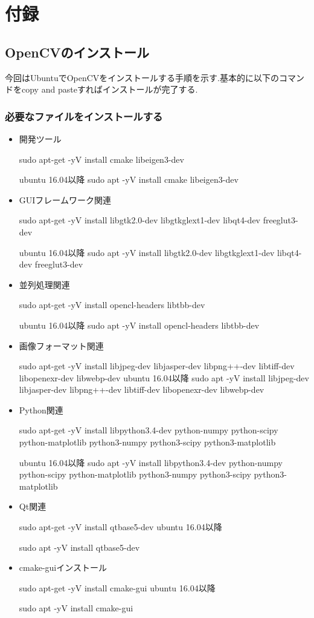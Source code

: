 \documentclass[12pt,oneside]{sotsuken_paper}
\begin{document}
\chapter*{付録}
\def\thesection{\Alph{section}}
\appendix%
\section{OpenCVのインストール}
今回はUbuntuでOpenCVをインストールする手順を示す.基本的に以下のコマンドをcopy and pasteすればインストールが完了する.
\subsection{必要なファイルをインストールする}
\begin{itemize}
\item 開発ツール

sudo apt-get -yV install cmake libeigen3-dev

ubuntu 16.04以降
sudo apt -yV install cmake libeigen3-dev

\item GUIフレームワーク関連

sudo apt-get -yV install libgtk2.0-dev libgtkglext1-dev libqt4-dev freeglut3-dev


ubuntu 16.04以降
sudo apt -yV install libgtk2.0-dev libgtkglext1-dev libqt4-dev freeglut3-dev

\item 並列処理関連

sudo apt-get -yV install opencl-headers libtbb-dev

ubuntu 16.04以降
sudo apt -yV install opencl-headers libtbb-dev

\item 画像フォーマット関連

sudo apt-get -yV install libjpeg-dev libjasper-dev libpng++-dev libtiff-dev libopenexr-dev libwebp-dev
ubuntu 16.04以降
sudo apt -yV install libjpeg-dev libjasper-dev libpng++-dev libtiff-dev libopenexr-dev libwebp-dev


\item Python関連

sudo apt-get -yV install libpython3.4-dev python-numpy python-scipy python-matplotlib python3-numpy python3-scipy python3-matplotlib

ubuntu 16.04以降
sudo apt -yV install libpython3.4-dev python-numpy python-scipy python-matplotlib python3-numpy python3-scipy python3-matplotlib

\item Qt関連

sudo apt-get -yV install qtbase5-dev
ubuntu 16.04以降

sudo apt -yV install qtbase5-dev

\item cmake-guiインストール

sudo apt-get -yV install cmake-gui
ubuntu 16.04以降

sudo apt -yV install cmake-gui

\end{itemize}
\end{document}
